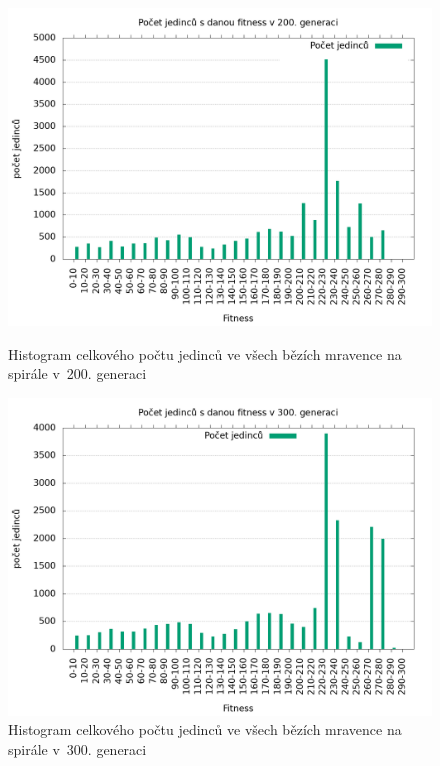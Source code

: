 \begin{figure}[h]
    \begin{minipage}[c]{0.48\linewidth}
        \includegraphics[width=\linewidth]{obrazky/mravenec_spirala_fitnessHistogram200.png}
        \caption{Histogram celkového počtu jedinců ve všech bězích mravence na spirále v~200. generaci}
        \label{fig:mravenec_spirala_histogram_200}
    \end{minipage}
    \hfill
    \begin{minipage}[c]{0.48\linewidth}
        \includegraphics[width=\linewidth]{obrazky/mravenec_spirala_fitnessHistogram300.png}
        \caption{Histogram celkového počtu jedinců ve všech bězích mravence na spirále v~300. generaci}
        \label{fig:mravenec_spirala_histogram_300}
    \end{minipage}
\end{figure}

